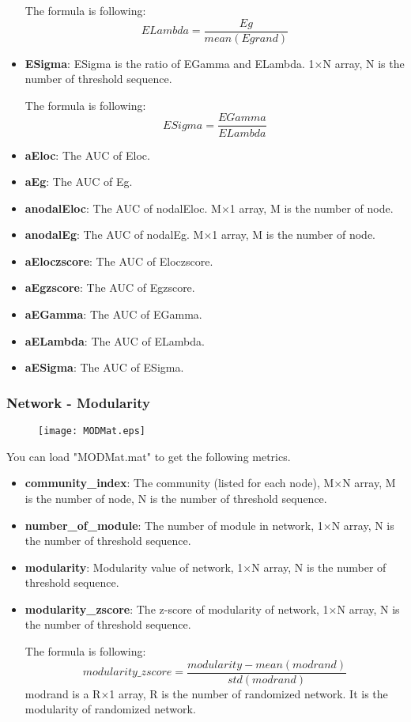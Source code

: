 \documentclass[11pt]{article}
\begin{document}
\begin{itemize}
						The formula is following:
						$$ELambda=\frac{Eg}{mean(Egrand)}$$
					\item \textbf{ESigma}: ESigma is the ratio of EGamma and ELambda.
						1$\times$N array, N is the number of threshold sequence.
						
						The formula is following:
						$$ESigma=\frac{EGamma}{ELambda}$$
					\item \textbf{aEloc}: The AUC of Eloc.
					\item \textbf{aEg}: The AUC of Eg.
					\item \textbf{anodalEloc}: The AUC of nodalEloc.
						M$\times$1 array, M is the number of node.
					\item \textbf{anodalEg}: The AUC of nodalEg.
						M$\times$1 array, M is the number of node.
					\item \textbf{aEloczscore}: The AUC of Eloczscore.
					\item \textbf{aEgzscore}: The AUC of Egzscore.
					\item \textbf{aEGamma}: The AUC of EGamma.
					\item \textbf{aELambda}: The AUC of ELambda.
					\item \textbf{aESigma}: The AUC of ESigma.
				\end{itemize}
			\subsubsection{Network - Modularity}
				\begin{figure}
					\begin{center}
						\texttt{[image: MODMat.eps]}
					\end{center}
				\end{figure}
				You can load "MODMat.mat" to get the following metrics.
				\begin{itemize}
					\item \textbf{community\_index}: The community (listed for each node),
						M$\times$N array, M is the number of node, N is the number of threshold sequence.
					\item \textbf{number\_of\_module}: The number of module in network,
						1$\times$N array, N is the number of threshold sequence.
					\item \textbf{modularity}: Modularity value of network,
						1$\times$N array, N is the number of threshold sequence.
					\item \textbf{modularity\_zscore}: The z-score of modularity of network,
						1$\times$N array, N is the number of threshold sequence.

						The formula is following:
						$$modularity\_zscore=\frac{modularity-mean(modrand)}{std(modrand)}$$
						modrand is a R$\times$1 array, R is the number of randomized network. 
						It is the modularity of randomized network.
				\end{itemize}
\end{document}
